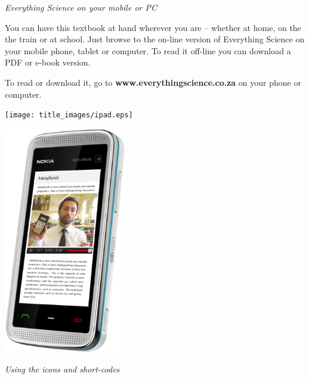 \newpage
\thispagestyle{empty}

{\normalfont\sffamily\fontsize{22}\normalfont\itshape Everything Science on your mobile or PC} \par

{\Large
You can have this textbook at hand wherever you are – whether at home, on the the train or at school.
Just browse to the on-line version of Everything Science on your mobile phone, tablet or computer. To
read it off-line you can download a PDF or e-book version.\par


To read or download it, go to \textbf{www.everythingscience.co.za} on your phone or computer.} \vspace*{2cm}


\begin{center}
\begin{minipage}{0.4\textwidth}
\centering
\texttt{[image: title\_images/ipad.eps]}
\end{minipage}
\begin{minipage}{0.4\textwidth}
\centering
\includegraphics[width=0.4\textwidth]{title_images/phone.eps}
\end{minipage}
\end{center}

\vspace*{2cm}


{\normalfont\sffamily\fontsize{22}\normalfont\itshape Using the icons and short-codes} \par

